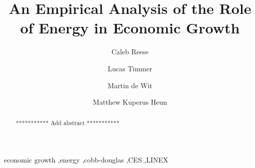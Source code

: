 \documentclass[preprint,authoryear,12pt]{elsarticle}\usepackage{graphicx, color}
\begin{document}
\begin{frontmatter}



\title{An Empirical Analysis of the Role of Energy in Economic Growth}


\author[Calvin]{Caleb Reese}
\author[Calvin]{Lucas Timmer}
\author[Stellenbosch]{Martin de Wit}
\author[Calvin]{Matthew Kuperus Heun}

\address[Calvin]{Engineering Department, Calvin College, Grand Rapids, MI 49546, USA}
\address[Stellenbosch]{ Stellenbosch University, School of Public Leadership, P.O. Box 610, Bellville 7535, South Africa}

\begin{abstract}
*********** Add abstract ***********
\end{abstract}

\begin{keyword}
economic growth \sep energy \sep cobb-douglas \sep CES \sep LINEX
\end{keyword}

\end{frontmatter}

\end{document}
